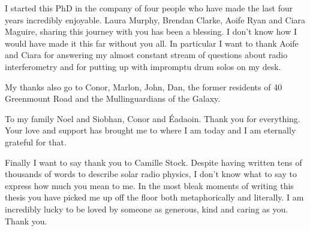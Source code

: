 \begin{acknowledgements}
I started this PhD in the company of four people who have made the last four years incredibly enjoyable. Laura Murphy, Brendan Clarke, Aoife Ryan and Ciara Maguire, sharing this journey with you has been a blessing. I don't know how I would have made it this far without you all.
In particular I want to thank Aoife and Ciara for answering my almost constant stream of questions about radio interferometry and for putting up with impromptu drum solos on my desk.

My thanks also go to Conor, Marlon, John, Dan, the former residents of 40 Greenmount Road and the Mullinguardians of the Galaxy.

To my family Noel and Siobhan, Conor and \'Eadaoin. Thank you for everything. Your love and support has brought me to where I am today and I am eternally grateful for that.

Finally I want to say thank you to Camille Stock. Despite having written tens of thousands of words to describe solar radio physics, I don't know what to say to express how much you mean to me. In the most bleak moments of writing this thesis you have picked me up off the floor both metaphorically and literally. I am incredibly lucky to be loved by someone as generous, kind and caring as you. Thank you.

\end{acknowledgements}

